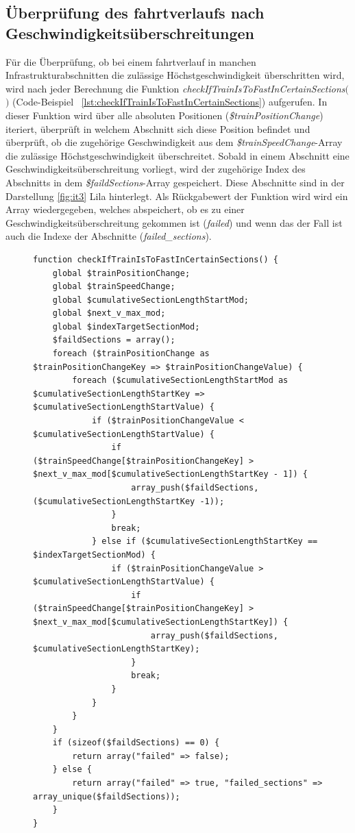 \subsection{Überprüfung des \Gls{fahrtverlauf}s nach Geschwindigkeitsüberschreitungen} \label{überprüfung}
Für die Überprüfung, ob bei einem \Gls{fahrtverlauf} in manchen Infrastrukturabschnitten die zulässige Höchstgeschwindigkeit überschritten wird, wird nach jeder Berechnung die Funktion \textit{checkIfTrainIsToFastInCertainSections$($$)$} (Code-Beispiel ~\ref{lst:checkIfTrainIsToFastInCertainSections}) aufgerufen. In dieser Funktion wird über alle absoluten Positionen (\textit{\$trainPositionChange}) iteriert, überprüft in welchem Abschnitt sich diese Position befindet und überprüft, ob die zugehörige Geschwindigkeit aus dem \textit{\$trainSpeedChange}-Array die zulässige Höchstgeschwindigkeit überschreitet. Sobald in einem Abschnitt eine Geschwindigkeitsüberschreitung vorliegt, wird der zugehörige Index des Abschnitts in dem \textit{\$faildSections}-Array gespeichert. Diese Abschnitte sind in der Darstellung \ref{fig:it3} Lila hinterlegt. Als Rückgabewert der Funktion wird wird ein Array wiedergegeben, welches abspeichert, ob es zu einer Geschwindigkeitsüberschreitung gekommen ist (\textit{\grqq{}failed\grqq{}}) und wenn das der Fall ist auch die Indexe der Abschnitte (\textit{\grqq{}failed\_sections\grqq{}}).
\begin{figure}
\begin{lstlisting}[caption={\textit{checkIfTrainIsToFastInCertainSections$($$)$}},captionpos=b,label={lst:checkIfTrainIsToFastInCertainSections}]
function checkIfTrainIsToFastInCertainSections() {
	global $trainPositionChange;
	global $trainSpeedChange;
	global $cumulativeSectionLengthStartMod;
	global $next_v_max_mod;
	global $indexTargetSectionMod;
	$faildSections = array();
	foreach ($trainPositionChange as $trainPositionChangeKey => $trainPositionChangeValue) {
		foreach ($cumulativeSectionLengthStartMod as $cumulativeSectionLengthStartKey => $cumulativeSectionLengthStartValue) {
			if ($trainPositionChangeValue < $cumulativeSectionLengthStartValue) {
				if ($trainSpeedChange[$trainPositionChangeKey] > $next_v_max_mod[$cumulativeSectionLengthStartKey - 1]) {
					array_push($faildSections, ($cumulativeSectionLengthStartKey -1));
				}
				break;
			} else if ($cumulativeSectionLengthStartKey == $indexTargetSectionMod) {
				if ($trainPositionChangeValue > $cumulativeSectionLengthStartValue) {
					if ($trainSpeedChange[$trainPositionChangeKey] > $next_v_max_mod[$cumulativeSectionLengthStartKey]) {
						array_push($faildSections, $cumulativeSectionLengthStartKey);
					}
					break;
				}
			}
		}
	}
	if (sizeof($faildSections) == 0) {
		return array("failed" => false);
	} else {
		return array("failed" => true, "failed_sections" => array_unique($faildSections));
	}
}
\end{lstlisting}
\end{figure}
